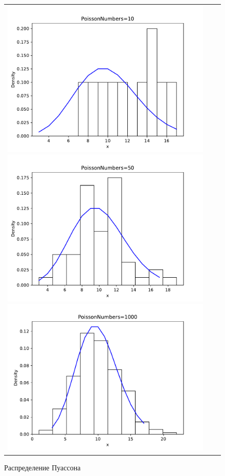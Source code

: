 \begin{figure}[H]
	\begin{tabular}{ccc}
		\includegraphics[scale=0.33]{poisson_hist_10.pdf}
		\includegraphics[scale=0.33]{poisson_hist_50.pdf}
		\includegraphics[scale=0.33]{poisson_hist_1000.pdf}
	\end{tabular}
	\caption{Распределение Пуассона}
\end{figure}


